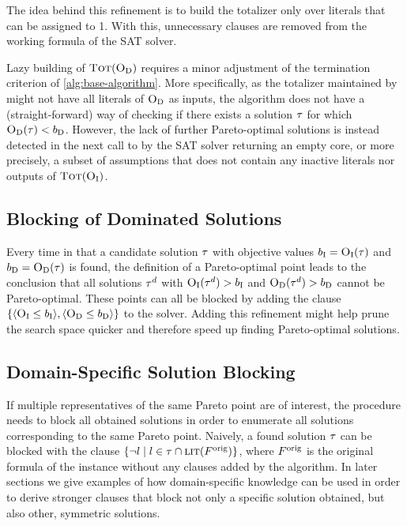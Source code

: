 The idea behind this refinement is to build the totalizer only over literals that can be assigned to 1.
With this, unnecessary clauses are removed from the working formula of the SAT solver.

Lazy building of $\textsc{Tot}(\textsc{O}_{\text{D}})$ requires a minor adjustment of the termination criterion of \cref{alg:base-algorithm}.
More specifically, as the totalizer maintained by \Simpr{} might not have all literals of $\textsc{O}_{\text{D}}$ as inputs, the algorithm does not have a (straight-forward) way of checking if there exists a solution $\tau$ for which $\textsc{O}_{\text{D}}(\tau) < b_{\text{D}}$.
However, the lack of further Pareto-optimal solutions is instead detected in the next call to \Min{} by the SAT solver returning an empty core, or more precisely, a subset of assumptions that does not contain any inactive literals nor outputs of $\textsc{Tot}(\textsc{O}_{\text{I}})$.

\subsection{Blocking of Dominated Solutions}

Every time in \algname{} that a candidate solution $\tau$ with objective values $b_{\text{I}} = \textsc{O}_{\text{I}}(\tau)$ and $b_{\text{D}} = \textsc{O}_{\text{D}}(\tau)$ is found, the definition of a Pareto-optimal point leads to the conclusion that all solutions $\tau^d$ with $\textsc{O}_{\text{I}}(\tau^d) > b_{\text{I}}$ and $\textsc{O}_{\text{D}}(\tau^d) > b_{\text{D}}$ cannot be Pareto-optimal.
These points can all be blocked by adding the clause $\{ \langle \textsc{O}_{\text{I}} \leq b_{\text{I}} \rangle, \langle \textsc{O}_{\text{D}} \leq b_{\text{D}} \rangle \}$ to the solver.
Adding this refinement might help prune the search space quicker and therefore speed up finding Pareto-optimal solutions.

\subsection{Domain-Specific Solution Blocking}

If multiple representatives of the same Pareto point are of interest, the procedure \E{} needs to block all obtained solutions in order to enumerate all solutions corresponding to the same Pareto point. 
Naively, a found solution $\tau$ can be blocked with the clause $\{ \lnot l \mid l \in \tau \cap \textsc{lit}(F^\text{orig}) \}$, where $F^\text{orig}$ is the original formula of the instance without any clauses added by the algorithm.
In later sections we give examples of how domain-specific knowledge can be used in order to derive stronger clauses that block not only a specific solution obtained, but also other, symmetric solutions.

